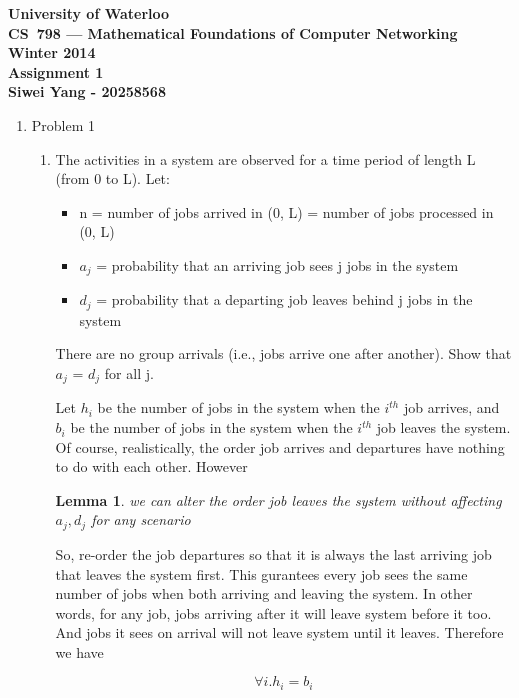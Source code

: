 \documentclass[12pt]{article}
\newtheorem{lem}[thm]{Lemma}
\begin{document}
\begin{center}
\large\bf University of Waterloo\\
CS~798 --- Mathematical Foundations of Computer Networking\\
Winter 2014\\
Assignment 1\\
Siwei Yang - 20258568\\
\end{center}
\bigskip

\begin{enumerate}
\item{Problem 1}

\begin{enumerate}
\item{} The activities in a system are observed for a time period of length L (from 0 to L).
Let:
\begin{itemize}
\item n = number of jobs arrived in (0, L) = number of jobs processed in (0, L) 
\item $a_j$ = probability that an arriving job sees j jobs in the system
\item $d_j$ = probability that a departing job leaves behind j jobs in the system
\end{itemize}
There are no group arrivals (i.e., jobs arrive one after another). Show that $a_j$ = $d_j$ for all j.

Let $h_i$ be the number of jobs in the system when the $i^{th}$ job arrives, and $b_i$ be the number of jobs in the system when the $i^{th}$ job leaves the system. Of course, realistically, the order job arrives and departures have nothing to do with each other. However

\begin{lem}
we can alter the order job leaves the system without affecting $a_j, d_j$
for any scenario
\end{lem}

So, re-order the job departures so that it is always the last arriving job that leaves the system first. This gurantees every job sees the same number of jobs when both arriving and leaving the system. In other words, for any job, jobs arriving after it will leave system before it too. And jobs it sees on arrival will not leave system until it leaves. Therefore we have

\begin{equation}
\forall i . h_i = b_i
\end{equation}


\end{enumerate}
\end{enumerate}
\end{document}
